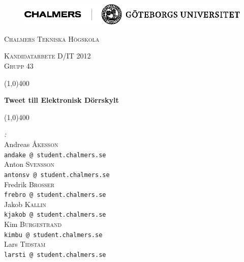 \documentclass[a4paper,11pt]{article}
\begin{document}
\begin{titlepage}

\begin{center}

\begin{figure}[H]
\includegraphics[width=1.0\textwidth, angle=0]{ChaGUsvart.png}
\label{fig:titel_img}
\end{figure}

\textsc{\LARGE Chalmers Tekniska Högskola}
\vspace{2 mm}

\textsc{\Large Kandidatarbete D/IT 2012}\\
\vspace{2 mm}
\textsc{Grupp 43}
\vspace{5 mm}


\begin{center}
\line(1,0){400}
\end{center}
\vspace{4 mm}
{ \huge \bfseries Tweet till Elektronisk Dörrskylt}\\[0.4cm]

\begin{center}
\line(1,0){400}
\end{center}
\vspace{15 mm}

\begin{minipage}{0.6\textwidth}
\begin{flushleft} \large
\emph{:}\\
Andreas \textsc{Åkesson}\\ \texttt{andake @ student.chalmers.se}\\
Anton \textsc{Svensson}\\ \texttt{antonsv @ student.chalmers.se}\\
Fredrik \textsc{Brosser}\\ \texttt{frebro @ student.chalmers.se}\\
Jakob \textsc{Kallin}\\ \texttt{kjakob @ student.chalmers.se}\\
Kim \textsc{Burgestrand}\\ \texttt{kimbu @ student.chalmers.se}\\
Lars \textsc{Tidstam}\\ \texttt{larsti @ student.chalmers.se}\\


\end{flushleft}
\end{minipage}
\end{center}
\end{titlepage}
\end{document}
